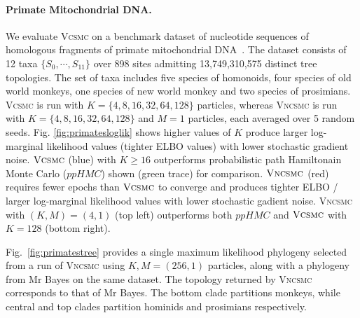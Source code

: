 \documentclass[accepted]{uai2021} %
\theoremstyle{definition}
\begin{document}
\paragraph{Primate Mitochondrial DNA.} 


We evaluate \textsc{Vcsmc} on a benchmark dataset of nucleotide sequences of homologous fragments of primate mitochondrial DNA~\citep{10.1093/oxfordjournals.molbev.a040524}. The dataset consists of 12 taxa $\{S_0,\cdots, S_{11}\}$ over 898 sites admitting 13,749,310,575 distinct tree topologies. The set of taxa includes five species of homonoids, four species of old world monkeys, one species of new world monkey and two species of prosimians. \textsc{Vcsmc} is run with $K=\{4,8,16,32,64,128\}$ particles, whereas \textsc{Vncsmc} is run with $K = \{4,8,16,32,64,128\}$ and $M=1$ particles, each averaged over 5 random seeds. Fig. \ref{fig:primatesloglik} shows higher values of $K$ produce larger log-marginal likelihood values (tighter ELBO values) with lower stochastic gradient noise. $\textsc{Vcsmc}$ (blue) with $K \geq 16$ outperforms probabilistic path Hamiltonain Monte Carlo ($ppHMC$) shown (green trace) for comparison.  $\textsc{Vncsmc}$ (red) requires fewer epochs than $\textsc{Vcsmc}$ to converge and produces tighter ELBO / larger log-marginal likelihood values with lower stochastic gadient noise. \textsc{Vncsmc} with $(K,M)= (4,1)$ (top left) outperforms both $ppHMC$ and $\textsc{Vcsmc}$ with $ K = 128$ (bottom right).

Fig.~\ref{fig:primatestree} provides a single maximum likelihood phylogeny selected from a run of \textsc{Vncsmc} using $K,M=(256,1)$ particles, along with a phylogeny from Mr Bayes on the same dataset. The topology returned by \textsc{Vncsmc} corresponds to that of Mr Bayes. The bottom clade partitions monkeys, while central and top clades partition
hominids and prosimians respectively. %




\end{document}
